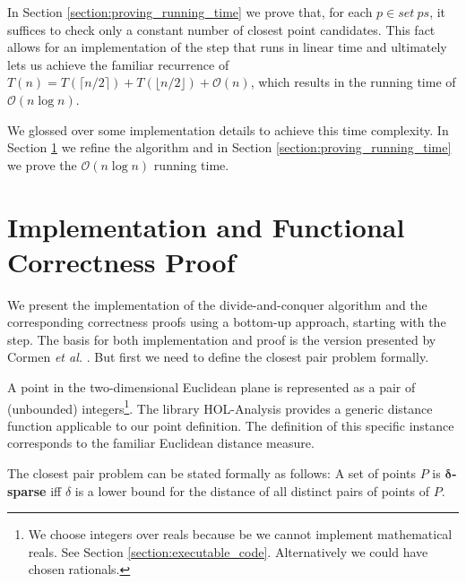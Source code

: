 \begin{isabellebody}
\begin{isamarkuptext}
In Section \ref{section:proving_running_time} we prove that, for each $p \in \mathit{set\ ps}$, it suffices to check
only a constant number of closest point candidates. This fact allows for an implementation of
the  step that runs in linear time and ultimately lets us achieve the familiar recurrence
of $T(n) = T(\lceil n/2 \rceil) + T(\lfloor n/2 \rfloor) + \mathcal{O}(n)$,
which results in the running time of $\mathcal{O}(n \log n)$.

We glossed over some implementation details to achieve this time complexity.
In Section \ref{section:proving_functional_correctness} we refine the algorithm and
in Section \ref{section:proving_running_time} we prove the $\mathcal{O}(n \log n)$ running time.


\section{Implementation and Functional Correctness Proof}
\label{section:proving_functional_correctness}

We present the implementation of the divide-and-conquer algorithm and the corresponding correctness proofs
using a bottom-up approach, starting with the  step. The basis for both implementation and proof is the version
presented by Cormen \emph{et al.} \cite{Introduction-to-Algorithms:2009}. But first we need to define the closest pair problem formally.

A point in the two-dimensional Euclidean plane is represented as a pair of (unbounded)
integers\footnote{We choose integers over reals because be we cannot implement
mathematical reals. See Section \ref{section:executable_code}. Alternatively we could have chosen rationals.}.
The library HOL-Analysis provides a generic distance function  applicable to our point definition.
The definition of this specific  instance corresponds to the familiar Euclidean distance measure.

The closest pair problem can be stated formally as follows: A set of points $P$ is $\mathbf{\delta}$\textbf{-sparse} iff
$\delta$ is a lower bound for the distance of all distinct pairs of points of $P$.


\end{isamarkuptext}
\end{isabellebody}

